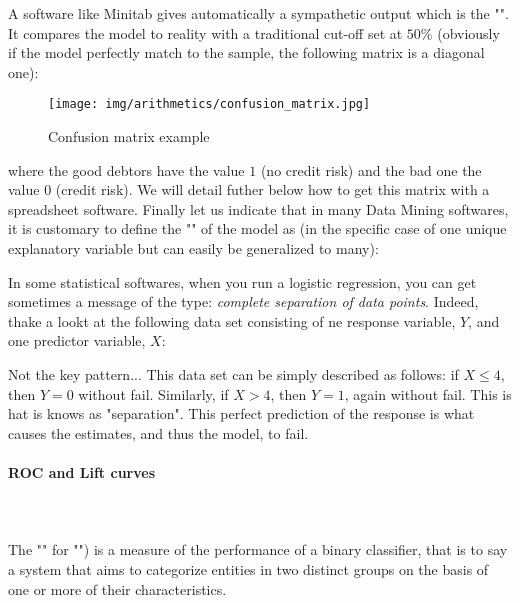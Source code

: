 	A software like Minitab gives automatically a sympathetic output which is the "". It compares the model to reality with a traditional cut-off set at $50\%$ (obviously if the model perfectly match to the sample, the following matrix is a diagonal one):
	\begin{figure}[H]
		\centering
		\texttt{[image: img/arithmetics/confusion\_matrix.jpg]}
		\caption{Confusion matrix example}
	\end{figure}
	where the good debtors have the value $1$ (no credit risk) and the bad one the value $0$ (credit risk). We will detail futher below how to get this matrix with a spreadsheet software. Finally let us indicate that in many Data Mining softwares, it is customary to define the "" of the model as (in the specific case of one unique explanatory variable but can easily be generalized to many):
	
	\begin{tcolorbox}[title=Remark,colframe=black,arc=10pt]
	In some statistical softwares, when you run a logistic regression, you can get sometimes a message of the type: \textit{complete separation of data points}. Indeed, thake a lookt at the following data set consisting of ne response variable, $Y$, and one predictor variable, $X$:
	
	Not the key pattern... This data set can be simply described as follows: if $X\leq 4$, then $Y=0$ without fail. Similarly, if $X>4$, then $Y=1$, again without fail. This is hat is knows as "separation". This perfect prediction of the response is what causes the estimates, and thus the model, to fail.
	\end{tcolorbox}
	
	\paragraph{ROC and Lift curves}\mbox{}\\\\
	The "" for "") is a measure of the performance of a binary classifier, that is to say a system that aims to categorize entities in two distinct groups on the basis of one or more of their characteristics. 

